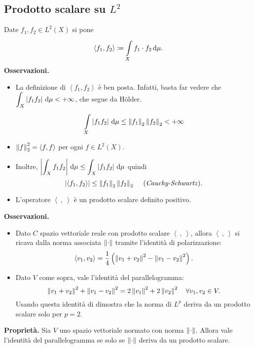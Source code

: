 \documentclass[a4paper, 12pt]{report}
\begin{document}
\subsection{Prodotto scalare su $L^2$}

Date $f_1,f_2 \in L^2(X)$ si pone
%
$$
\left<f_1, f_2 \right> \coloneqq \int\limits_{\mathclap{X}}^{} f_1 \cdot f_2 \dd \mu.
$$
%
\textbf{Osservazioni.}

\begin{itemize}
\item La definizione di $\left<f_1, f_2 \right>$ è ben posta.
Infatti, basta far vedere che $\displaystyle \int_X \left| f_1 f_2 \right| \,\mathrm{d} \mu < +\infty$, che segue da H\"{o}lder.
%
$$
\int\limits_{\mathclap{X}}^{} \left| f_1 f_2 \right| \dd \mu \leq \norm{f_1}_2 \norm{f_2}_2 < +\infty
$$
%

\item $\left\lVert f \right\rVert_2^2 = \left<f,f \right>$ per ogni $f \in L^2(X)$.

\item Inoltre, $\displaystyle \left| \int_X f_1 f_2 \right| \,\mathrm{d} \mu \leq \int_X \left| f_1 f_2 \right| \,\mathrm{d} \mu$ quindi
%
$$
\left| \left<f_1, f_2 \right> \right| \leq \left\lVert f_1 \right\rVert_2 \left\lVert f_2 \right\rVert_2 \quad \; \text{(\textit{Cauchy-Schwartz})}.
$$
%

\item L'operatore $\left< \ , \ \right>$ è un prodotto scalare definito positivo.

\end{itemize}

\textbf{Osservazioni.}
\begin{itemize}
\item Dato $C$ spazio vettoriale reale con prodotto scalare $\left<\ ,\ \right>$, allora $\left<\ ,\ \right>$ si ricava dalla norma associata $\left\lVert \cdot \right\rVert$ tramite l'identità di polarizzazione:
%
$$
\left<v_1, v_2 \right> = \frac{1}{4} \left( \left\lVert v_1 + v_2 \right\rVert^2 - \left\lVert v_1 - v_2 \right\rVert^2 \right).
$$
%

\item  Dato $V$ come sopra, vale l'identità del parallelogramma:
%
$$
\left\lVert v_1 + v_2 \right\rVert^2 + \left\lVert v_1 - v_2 \right\rVert^2 = 2 \left\lVert v_1 \right\rVert^2 + 2 \left\lVert v_2 \right\rVert^2 \quad \forall v_1,v_2 \in V.
$$
%
 Usando questa identità di dimostra che la norma di $L^p$ deriva da un prodotto scalare solo per $p=2$.

\end{itemize}

\textbf{Proprietà.}
Sia $V$ uno spazio vettoriale normato con norma $\left\lVert \cdot \right\rVert$. Allora vale l'identità del parallelogramma se solo se $\left\lVert \cdot \right\rVert$ deriva da un prodotto scalare.
\end{document}
